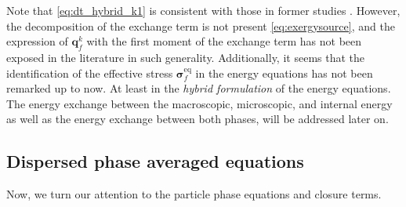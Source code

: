 Note that \eqref{eq:dt_hybrid_k1} is consistent with those in former studies \citep[Chapter 7]{morel2015mathematical}\citep[Chapter 2]{scorsim2021particle}\citet{kataoka1989basic}. 
However, the decomposition of the exchange term is not present \eqref{eq:exergysource}, and the expression of $\textbf{q}_f^k$ with the first moment of the exchange term has not been exposed in the literature in such generality.
Additionally, it seems that the identification of the effective stress $\bm\sigma^\text{eq}_f$ in the energy equations has not been remarked up to now.
At least in the \textit{hybrid formulation} of the energy equations. 
The energy exchange between the macroscopic, microscopic, and internal energy as well as the energy exchange between both phases, will be addressed later on.   


\subsection{Dispersed phase averaged equations}

Now, we turn our attention to the particle phase equations and closure terms. 

